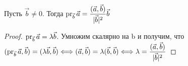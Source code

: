 \begin{proposition}
Пусть \(\vec{b}\ne0\). Тогда \(\operatorname{pr}_{\vec{b}}\vec{a} = \dfrac{(\vec{a}, \vec{b})}{|\vec{b}|^2}\vec{b}\)
\end{proposition}
\begin{proof}
\(\operatorname{pr}_{\vec{b}}\vec{a} = \lambda \vec{b}\). Умножим скалярно на b и получим, что 
\((\operatorname{pr}_{\vec{b}}\vec{a}, \vec{b}) = (\lambda \vec{b}, \vec{b})\Longleftrightarrow (\vec{a}, \vec{b}) = \lambda (\vec{b}, \vec{b})\Longleftrightarrow \lambda = \dfrac{(\vec{a},\vec{b})}{|\vec{b}|^2}\)
\end{proof}

